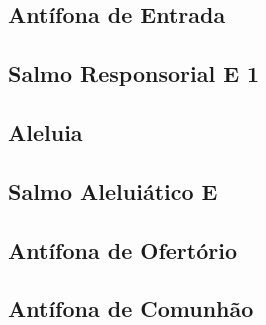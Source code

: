 \subsection{Antífona de Entrada}\label{subsection:tempus-adventus/missa-1/introitus}

\subsection[Salmo Responsorial]{Salmo Responsorial \textmd{E 1}}\label{subsection:tempus-adventus/missa-1/psalmus-responsorius}

\AllowPageFlush

\subsection{Aleluia}\label{subsection:tempus-adventus/missa-1/alleluia}

\AllowPageFlush

\subsection[Salmo Aleluiático]{Salmo Aleluiático \textmd{E \protect\GreStar}}\label{subsection:tempus-adventus/missa-1/psalmus-alleluiaticus}

\AllowPageFlush

\subsection{Antífona de Ofertório}\label{subsection:tempus-adventus/missa-1/offertorium}

\AllowPageFlush

\subsection{Antífona de Comunhão}\label{subsection:tempus-adventus/missa-1/communio}

\AllowPageFlush